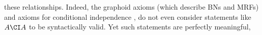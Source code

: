 these relationships.
Indeed, the graphoid axioms (which describe BNs and MRFs) \cite{pearl1987graphoids} and axioms for conditional independence \citep{naumov2013re},
do not even consider statements like $A \CI A$ to be syntactically valid. 
%
Yet such statements are perfectly meaningful,
